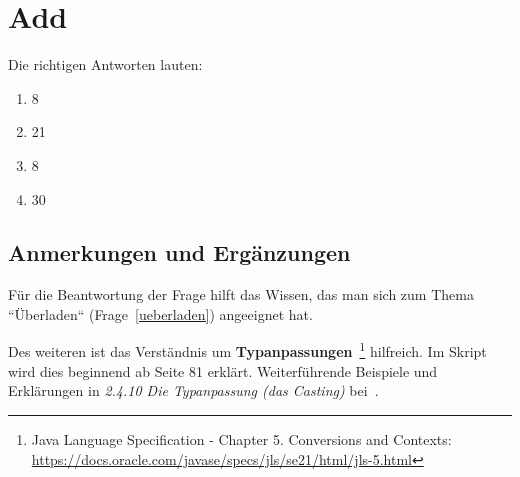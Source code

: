 \chapter{Add}

Die richtigen Antworten lauten:

\begin{enumerate}
    \item 8
    \item 21
    \item 8
    \item 30
\end{enumerate}


\section*{Anmerkungen und Ergänzungen}

Für die Beantwortung der Frage hilft das Wissen, das man sich zum Thema ``Überladen`` (Frage~\ref{ueberladen}) angeeignet hat.

Des weiteren ist das Verständnis um \textbf{Typanpassungen}~\footnote{
    Java Language Specification - Chapter 5. Conversions and Contexts: \url{https://docs.oracle.com/javase/specs/jls/se21/html/jls-5.html}
} hilfreich.
Im Skript wird dies beginnend ab Seite 81 erklärt.
Weiterführende Beispiele und Erklärungen in \textit{2.4.10 Die Typanpassung (das Casting)} bei~\cite[170 ff.]{Ull12}.